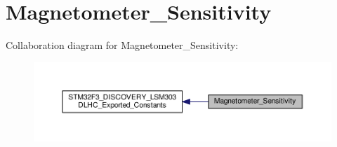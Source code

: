\hypertarget{group__Magnetometer__Sensitivity}{\section{Magnetometer\+\_\+\+Sensitivity}
\label{group__Magnetometer__Sensitivity}
}
Collaboration diagram for Magnetometer\+\_\+\+Sensitivity\+:\nopagebreak
\begin{figure}[H]
\begin{center}
\leavevmode
\includegraphics[width=350pt]{group__Magnetometer__Sensitivity}
\end{center}
\end{figure}
